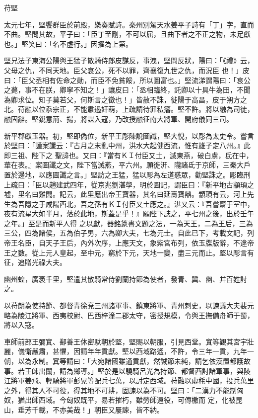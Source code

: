 
\begin{pinyinscope}
苻堅



 太元七年，堅饗群臣於前殿，樂奏賦詩。秦州別駕天水姜平子詩有「丁」字，直而不曲。堅問其故，平子曰：「臣丁至剛，不可以屈，且曲下者之不正之物，未足獻也。」堅笑曰：「名不虛行。」因擢為上第。



 堅兄法子東海公陽與王猛子散騎侍郎皮謀反，事洩，堅問反狀，陽曰：「《禮》云，父母之仇，不同天地。臣父哀公，死不以罪，齊襄復九世之仇，而況臣
 也！」皮曰：「臣父丞相有佐命之勛，而臣不免貧餒，所以圖富也。」堅流涕謂陽曰：「哀公之薨，事不在朕，卿寧不知之！」讓皮曰：「丞相臨終，託卿以十具牛為田，不聞為卿求位。知子莫若父，何斯言之徵也！」皆赦不誅，徙陽于高昌，皮于朔方之北。苻融以位忝宗正，不能肅遏奸萌，上疏請待罪私籓。堅不許。將以融為司徒，融固辭。堅銳意荊、揚，將謀入寇，乃改授融征南大將軍、開府儀同三司。



 新平郡獻玉器。初，堅即偽位，新平王彫陳說圖讖，堅大悅，以彫為太史令。嘗言於堅曰：「謹案讖云：『古月之末亂中州，洪水大起健西流，惟有雄子定八州。』此即三祖、陛下之
 聖諱也。又曰：『當有ＫＩ付臣又土，滅東燕，破白虜，氐在中，華在表。』案圖讖之文，陛下當滅燕，平六州。願徙汧、隴諸氐于京師，三秦大戶置於邊地，以應圖讖之言。」堅訪之王猛，猛以彫為左道惑眾，勸堅誅之。彫臨刑上疏曰：「臣以趙建武四年，從京兆劉湛學，明於圖記，謂臣曰：『新平地古顓頊之墟，里名曰雞閭。記云，此里應出帝王寶器，其名曰延壽寶鼎。顓頊有云，河上先生為吾隱之于咸陽西北，吾之孫有ＫＩ付臣又土應之。』湛又云：『吾嘗齋于室中，夜有流星大如半月，落於此地，斯蓋是乎！』願陛下誌之，平七州之後，出於壬午之年。」至是而新平人得
 之以獻，器銘篆書文題之法，一為天王，二為王后，三為三公，四為諸侯，五為伯子男，六為卿大夫，七為元士。自此已下，考載文記，列帝王名臣，自天子王后，內外次序，上應天文，象紫宮布列，依玉牒版辭，不違帝王之數。從上元人皇起，至中元，窮於下元，天地一變，盡三元而止。堅以彫言有征，追贈光祿大夫。



 幽州蝗，廣袤千里，堅遣其散騎常侍劉蘭持節為使者，發青、冀、幽、并百姓討之。



 以苻朗為使持節、都督青徐兗三州諸軍事、鎮東將軍、青州刺史，以諫議大夫裴元略為陵江將軍、西夷校尉、巴西梓潼二郡太守，密授規模，令與王撫備舟師于蜀，
 將以入寇。



 車師前部王彌窴、鄯善王休密馱朝於堅，堅賜以朝服，引見西堂。窴等觀其宮宇壯麗，儀衛嚴肅，甚懼，因請年年貢獻。堅以西域路遙，不許，令三年一貢，九年一朝，以為永制。窴等請曰：「大宛諸國雖通貢獻，然誠節未純，請乞依漢置都護故事。若王師出關，請為鄉導。」堅於是以驍騎呂光為持節、都督西討諸軍事，與陵江將軍姜飛、輕騎將軍彭晃等配兵七萬，以討定西域。苻融以虛秏中國，投兵萬里之外，得其人不可役，得其地不可耕，固諫以為不可。堅曰：「二漢力不能制匈奴，猶出師西域。今匈奴既平，易若摧朽，雖勞師遠役，可傳檄而
 定，化被昆山，垂芳千載，不亦美哉！」朝臣又屢諫，皆不納。




\end{pinyinscope}
